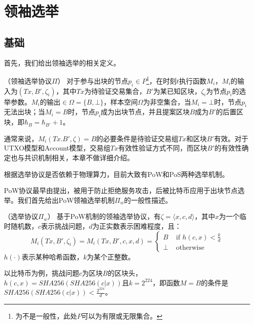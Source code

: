 \section{领袖选举}


\label{sec:leader_election}
\subsection{基础}


首先，我们给出领袖选举的相关定义。
\begin{definition}
（领袖选举协议$\Pi$） 对于参与出块的节点$p_i\in P$\footnote{为不是一般性，此处$P$可以为有限或无限集合。}，在时刻$t$执行函数$M_i$，$M_i$的输入为$(Tx,B',\zeta_i)$，其中$Tx$为待验证交易集合，$B'$为某已知区块，$\zeta_i$为节点$p_i$的选举参数。$M_i$的输出$\in\Omega=\{B,\bot\}$，样本空间$\Omega$为非空集合，当$M_i=\bot$时，节点$p_i$无法出块；当$M_i=B$时，节点$p_i$成为出块节点，并且提案区块$B$成为$B'$的后置区块，即$\hbar_B=\hbar_{B'}+1$。
\end{definition}

通常来说，$M_i(Tx.B',\zeta)=B$的必要条件是待验证交易组$Tx$和区块$B'$有效。对于UTXO模型和Account模型，交易组$Tx$有效性验证方式不同，而区块$B'$的有效性确定也与共识机制相关，本章不做详细介绍。

根据选举协议是否依赖于物理算力，目前大致有PoW和PoS两种选举机制。

PoW协议最早由\cite{dwork1992pricing}提出，被用于防止拒绝服务攻击，后被比特币应用于出块节点选举\cite{nakamoto2008bitcoin}。我们首先给出PoW领袖选举机制$\Pi_w$的一般性描述。

\begin{definition}
（选举协议$\Pi_w$） 基于PoW机制的领袖选举协议，有$\zeta=\langle x,c,d \rangle$，其中$x$为一个临时随机数，$c$表示挑战问题，$d$为正实数表示困难程度，且：\\
\begin{equation}
\label{eq:pow}
M_i(Tx,B',\zeta_i)=M_i(Tx,B',c,x,d)=\begin{cases}
B & \text{ if } h(c,x)<\frac{k}{d} \\ 
\bot & \text{ otherwise}
\end{cases}
\end{equation}
$h(\cdot)$表示某种哈希函数，$k$为某个正整数。
\end{definition}

以比特币为例，挑战问题$c$为区块$B$的区块头，$h(c,x)=SHA256(SHA256(c|x))$且$k=2^{224}$，即函数$M=B$的条件是$SHA256(SHA256(c|x))<\frac{2^{224}}{d}$。

